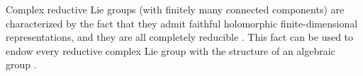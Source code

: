





Complex reductive Lie groups (with finitely many connected components) are characterized by the fact that they admit faithful holomorphic finite-dimensional representations, and they are all completely reducible \parencite[Th. 15.3.11]{hilgert2011structure}. This fact can be used to endow every reductive complex Lie group with the structure of an algebraic group \parencite[III. 8]{bröcker2003representations}.

